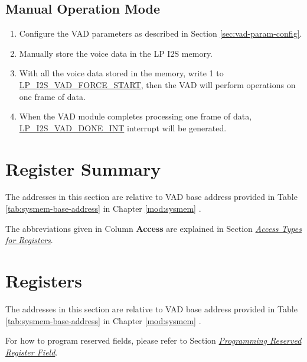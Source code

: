 \documentclass[main\_\_EN.tex]{subfiles}
\begin{document}
\subsection{Manual Operation Mode}

\begin{enumerate}
    \item Configure the VAD parameters as described in Section \ref{sec:vad-param-config}.
    \item Manually store the voice data in the LP I2S memory.
    \item With all the voice data stored in the memory, write 1 to \hyperref[fielddesc:LPI2SVADFORCESTART]{LP\_I2S\_VAD\_FORCE\_START}, then the VAD will perform operations on one frame of data.
    \item When the VAD module completes processing one frame of data, \hyperref[int:LPI2SVADDONEINT]{LP\_I2S\_VAD\_DONE\_INT} interrupt will be generated.
\end{enumerate}



\newpage
\hypertarget{vad-reg-summ}{}
\section{Register Summary}
\label{sec:vad-reg-summ}

The addresses in this section are relative to VAD base address provided in Table \ref{tab:sysmem-base-address} in Chapter \ref{mod:sysmem} \textit{}.

The abbreviations given in Column \textbf{Access} are explained in Section \hyperref[glossary-access-types]{\textit{Access Types for Registers}}.






\newpage
\section{Registers}

The addresses in this section are relative to VAD base address provided in Table \ref{tab:sysmem-base-address} in Chapter \ref{mod:sysmem} \textit{}.

For how to program reserved fields, please refer to Section \hyperref[programming-reserved-field]{\textit{Programming Reserved Register Field}}.



\end{document}
